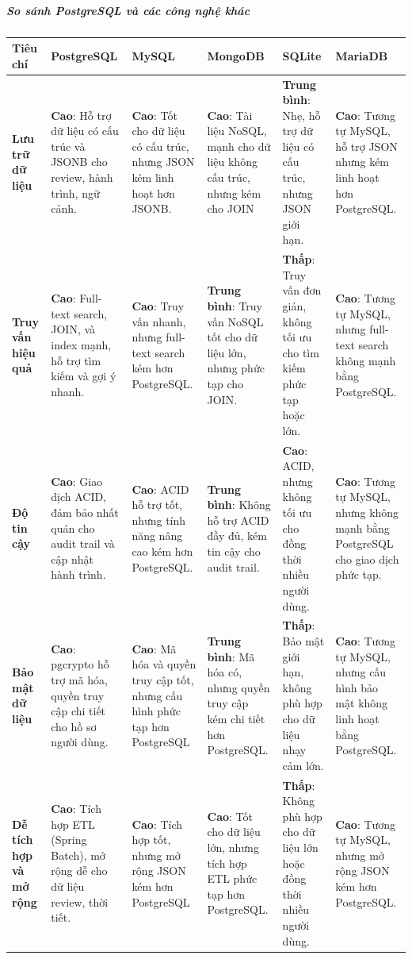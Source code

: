 \subparagraph{So sánh PostgreSQL và các công nghệ khác}
\clearpage
\begin{landscape}
\begin{table}[h!]
\centering
\setlength{\tabcolsep}{4pt}
\footnotesize
\begin{tabularx}{\linewidth}{|l|X|X|X|X|X|}
\hline
\textbf{Tiêu chí} & \textbf{PostgreSQL} & \textbf{MySQL} & \textbf{MongoDB} & \textbf{SQLite} & \textbf{MariaDB} \\
\hline
\textbf{Lưu trữ dữ liệu} & \textbf{Cao}: Hỗ trợ dữ liệu có cấu trúc và JSONB cho review, hành trình, ngữ cảnh. & \textbf{Cao}: Tốt cho dữ liệu có cấu trúc, nhưng JSON kém linh hoạt hơn JSONB. & \textbf{Cao}: Tài liệu NoSQL, mạnh cho dữ liệu không cấu trúc, nhưng kém cho JOIN & \textbf{Trung bình}: Nhẹ, hỗ trợ dữ liệu có cấu trúc, nhưng JSON giới hạn. & \textbf{Cao}: Tương tự MySQL, hỗ trợ JSON nhưng kém linh hoạt hơn PostgreSQL. \\
\hline
\textbf{Truy vấn hiệu quả} & \textbf{Cao}: Full-text search, JOIN, và index mạnh, hỗ trợ tìm kiếm và gợi ý nhanh. & \textbf{Cao}: Truy vấn nhanh, nhưng full-text search kém hơn PostgreSQL. & \textbf{Trung bình}: Truy vấn NoSQL tốt cho dữ liệu lớn, nhưng phức tạp cho JOIN. & \textbf{Thấp}: Truy vấn đơn giản, không tối ưu cho tìm kiếm phức tạp hoặc lớn. & \textbf{Cao}: Tương tự MySQL, nhưng full-text search không mạnh bằng PostgreSQL. \\
\hline
\textbf{Độ tin cậy} & \textbf{Cao}: Giao dịch ACID, đảm bảo nhất quán cho audit trail và cập nhật hành trình. & \textbf{Cao}: ACID hỗ trợ tốt, nhưng tính năng nâng cao kém hơn PostgreSQL. & \textbf{Trung bình}: Không hỗ trợ ACID đầy đủ, kém tin cậy cho audit trail. & \textbf{Cao}: ACID, nhưng không tối ưu cho đồng thời nhiều người dùng. & \textbf{Cao}: Tương tự MySQL, nhưng không mạnh bằng PostgreSQL cho giao dịch phức tạp. \\
\hline
\textbf{Bảo mật dữ liệu} & \textbf{Cao}: pgcrypto hỗ trợ mã hóa, quyền truy cập chi tiết cho hồ sơ người dùng. & \textbf{Cao}: Mã hóa và quyền truy cập tốt, nhưng cấu hình phức tạp hơn PostgreSQL & \textbf{Trung bình}: Mã hóa có, nhưng quyền truy cập kém chi tiết hơn PostgreSQL. & \textbf{Thấp}: Bảo mật giới hạn, không phù hợp cho dữ liệu nhạy cảm lớn. & \textbf{Cao}: Tương tự MySQL, nhưng cấu hình bảo mật không linh hoạt bằng PostgreSQL. \\
\hline
\textbf{Dễ tích hợp và mở rộng} & \textbf{Cao}: Tích hợp ETL (Spring Batch), mở rộng dễ cho dữ liệu review, thời tiết. & \textbf{Cao}: Tích hợp tốt, nhưng mở rộng JSON kém hơn PostgreSQL & \textbf{Cao}: Tốt cho dữ liệu lớn, nhưng tích hợp ETL phức tạp hơn PostgreSQL. & \textbf{Thấp}: Không phù hợp cho dữ liệu lớn hoặc đồng thời nhiều người dùng. & \textbf{Cao}: Tương tự MySQL, nhưng mở rộng JSON kém hơn PostgreSQL. \\

\end{tabularx}
\end{table}
\end{landscape}
